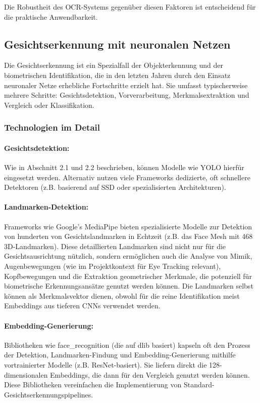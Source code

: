 Die Robustheit des OCR-Systems gegenüber diesen Faktoren ist entscheidend für die praktische Anwendbarkeit.

\subsection{Gesichtserkennung mit neuronalen Netzen}

Die Gesichtserkennung ist ein Spezialfall der Objekterkennung und der biometrischen Identifikation, die in den letzten Jahren durch den Einsatz neuronaler Netze erhebliche Fortschritte erzielt hat. Sie umfasst typischerweise mehrere Schritte: Gesichtsdetektion, Vorverarbeitung, Merkmalsextraktion und Vergleich oder Klassifikation.

\subsubsection{Technologien im Detail}

\paragraph{Gesichtsdetektion:} 
Wie in Abschnitt 2.1 und 2.2 beschrieben, können Modelle wie YOLO hierfür eingesetzt werden. Alternativ nutzen viele Frameworks dedizierte, oft schnellere Detektoren (z.B. basierend auf SSD oder spezialisierten Architekturen).

\paragraph{Landmarken-Detektion:} 
Frameworks wie Google's MediaPipe bieten spezialisierte Modelle zur Detektion von hunderten von Gesichtslandmarken in Echtzeit (z.B. das Face Mesh mit 468 3D-Landmarken). Diese detaillierten Landmarken sind nicht nur für die Gesichtsausrichtung nützlich, sondern ermöglichen auch die Analyse von Mimik, Augenbewegungen (wie im Projektkontext für Eye Tracking relevant), Kopfbewegungen und die Extraktion geometrischer Merkmale, die potenziell für biometrische Erkennungsansätze genutzt werden können. Die Landmarken selbst können als Merkmalsvektor dienen, obwohl für die reine Identifikation meist Embeddings aus tieferen CNNs verwendet werden.

\paragraph{Embedding-Generierung:} 
Bibliotheken wie face\_recognition (die auf dlib basiert) kapseln oft den Prozess der Detektion, Landmarken-Findung und Embedding-Generierung mithilfe vortrainierter Modelle (z.B. ResNet-basiert). Sie liefern direkt die 128-dimensionalen Embeddings, die dann für den Vergleich genutzt werden können. Diese Bibliotheken vereinfachen die Implementierung von Standard-Gesichtserkennungspipelines.

